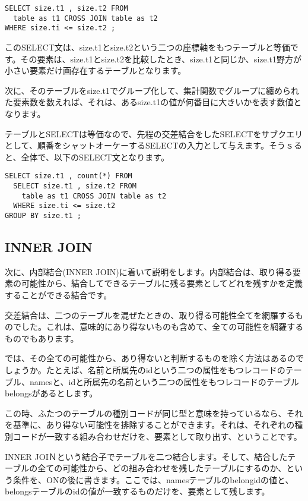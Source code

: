 \begin{verbatim}
SELECT size.t1 , size.t2 FROM
  table as t1 CROSS JOIN table as t2
WHERE size.ti <= size.t2 ;
\end{verbatim}

このSELECT文は、size.t1とsize.t2という二つの座標軸をもつテーブルと等価です。その要素は、size.t1とsize.t2を比較したとき、size.t1と同じか、size.t1野方が小さい要素だけ画存在するテーブルとなります。

次に、そのテーブルをsize.t1でグループ化して、集計関数でグループに纏められた要素数を数えれば、それは、あるsize.t1の値が何番目に大きいかを表す数値となります。

テーブルとSELECTは等価なので、先程の交差結合をしたSELECTをサブクエリとして、順番をシャットオーケーするSELECTの入力として与えます。そうｓると、全体で、以下のSELECT文となります。

\begin{verbatim}
SELECT size.t1 , count(*) FROM
  SELECT size.t1 , size.t2 FROM
    table as t1 CROSS JOIN table as t2
  WHERE size.ti <= size.t2
GROUP BY size.t1 ;
\end{verbatim}

\subsection{INNER JOIN}

次に、内部結合(INNER JOIN)に着いて説明をします。内部結合は、取り得る要素の可能性から、結合してできるテーブルに残る要素としてどれを残すかを定義することができる結合です。

交差結合は、二つのテーブルを混ぜたときの、取り得る可能性全てを網羅するものでした。これは、意味的にあり得ないものも含めて、全ての可能性を網羅するものでもあります。

では、その全ての可能性から、あり得ないと判断するものを除く方法はあるのでしょうか。たとえば、名前と所属先のidという二つの属性をもつレコードのテーブル、namesと、idと所属先の名前という二つの属性をもつレコードのテーブルbelongsがあるとします。

この時、ふたつのテーブルの種別コードが同じ型と意味を持っているなら、それを基準に、あり得ない可能性を排除することができます。それは、それぞれの種別コードが一致する組み合わせだけを、要素として取り出す、ということです。

INNER JOIＮという結合子でテーブルを二つ結合します。そして、結合したテーブルの全ての可能性から、どの組み合わせを残したテーブルにするのか、という条件を、ONの後に書きます。ここでは、namesテーブルのbelongidの値と、belongsテーブルのidの値が一致するものだけを、要素として残します。

